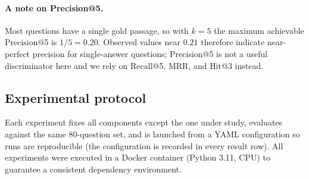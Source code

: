 \paragraph{A note on Precision@5.}
Most questions have a single gold passage, so with $k=5$ the maximum achievable
Precision@5 is $1/5 = 0.20$. Observed values near $0.21$ therefore indicate
near-perfect precision for single-answer questions; Precision@5 is not a useful
discriminator here and we rely on Recall@5, MRR, and Hit@3 instead.

\subsection{Experimental protocol}
Each experiment fixes all components except the one under study, evaluates
against the same 80-question set, and is launched from a YAML configuration so
runs are reproducible (the configuration is recorded in every result row). All
experiments were executed in a Docker container (Python 3.11, CPU) to guarantee
a consistent dependency environment.
